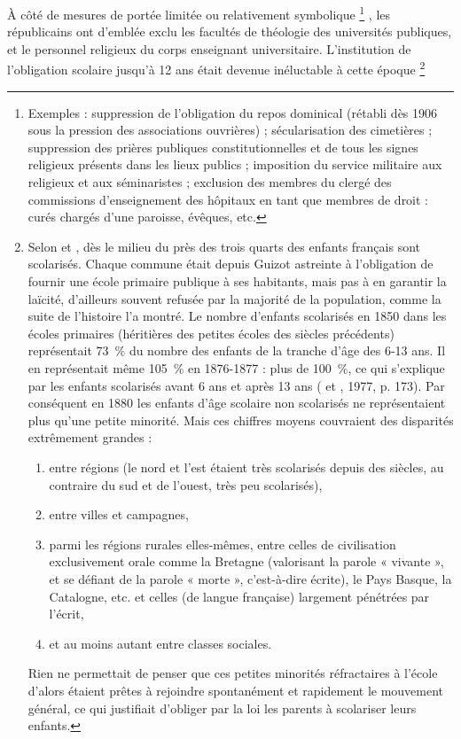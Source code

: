  À côté de mesures de portée limitée ou relativement symbolique%
\footnote{Exemples : suppression de l'obligation du repos dominical (rétabli dès 1906 sous la pression des associations ouvrières) ; sécularisation des cimetières ; suppression des prières publiques constitutionnelles et de tous les signes religieux présents dans les lieux publics ; imposition du service militaire aux religieux et aux séminaristes ; exclusion des membres du clergé des commissions d'enseignement des hôpitaux en tant que membres de droit : curés chargés d'une paroisse, évêques, etc.}%
, les républicains ont d'emblée exclu les facultés de théologie des universités publiques, et le personnel religieux du corps enseignant universitaire. L'institution de l'obligation scolaire jusqu'à 12 ans était devenue inéluctable à cette époque%
\footnote{Selon  et , dès le milieu du  près des trois quarts des enfants français sont scolarisés. Chaque commune était depuis Guizot astreinte à l'obligation de fournir une école primaire publique à ses habitants, mais pas à en garantir la laïcité, d'ailleurs souvent refusée par la majorité de la population, comme la suite de l'histoire l'a montré. Le nombre d'enfants scolarisés en 1850 dans les écoles primaires (héritières des petites écoles des siècles précédents) représentait 73~\% du nombre des enfants de la tranche d'âge des 6-13 ans. Il en représentait même 105~\% en 1876-1877 : plus de 100~\%, ce qui s'explique par les enfants scolarisés avant 6 ans et après 13 ans ( et , 1977, p. 173). Par conséquent en 1880 les enfants d'âge scolaire non scolarisés ne représentaient plus qu'une petite minorité. Mais ces chiffres moyens couvraient des disparités extrêmement grandes :
\begin{enumerate}[label=\alph*.,itemsep=0pt]
\item entre régions (le nord et l'est étaient très scolarisés depuis des siècles, au contraire du sud et de l'ouest, très peu scolarisés),
\item entre villes et campagnes,
\item parmi les régions rurales elles-mêmes, entre celles de civilisation exclusivement orale comme la Bretagne (valorisant la parole « vivante », et se défiant de la parole « morte », c'est-à-dire écrite), le Pays Basque, la Catalogne, etc. et celles (de langue française) largement pénétrées par l'écrit,
\item et au moins autant entre classes sociales.
\end{enumerate}

 Rien ne permettait de penser que ces petites minorités réfractaires à l'école d'alors étaient prêtes à rejoindre spontanément et rapidement le mouvement général, ce qui justifiait d'obliger par la loi les parents à scolariser leurs enfants.}%
